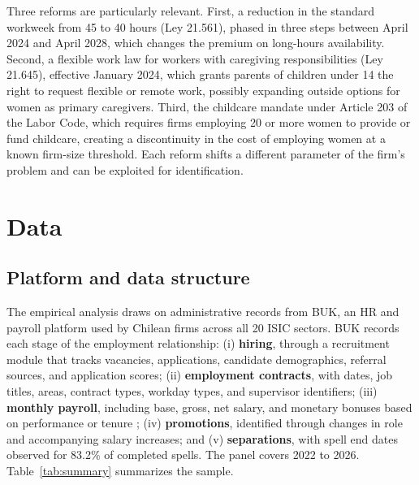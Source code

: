 \documentclass[11pt]{article}
\begin{document}
Three reforms are particularly relevant. First, a reduction in the standard workweek from 45 to 40 hours (Ley 21.561), phased in three steps between April 2024 and April 2028, which changes the premium on long-hours availability. Second, a flexible work law for workers with caregiving responsibilities (Ley 21.645), effective January 2024, which grants parents of children under 14 the right to request flexible or remote work, possibly expanding outside options for women as primary caregivers. Third, the childcare mandate under Article 203 of the Labor Code, which requires firms employing 20 or more women to provide or fund childcare, creating a discontinuity in the cost of employing women at a known firm-size threshold. Each reform shifts a different parameter of the firm's problem and can be exploited for identification.

\section{Data}

\subsection{Platform and data structure}

The empirical analysis draws on administrative records from BUK, an HR and payroll platform used by Chilean firms across all 20 ISIC sectors. BUK records each stage of the employment relationship: (i) \textbf{hiring}, through a recruitment module that tracks vacancies, applications, candidate demographics, referral sources, and application scores; (ii) \textbf{employment contracts}, with dates, job titles, areas, contract types, workday types, and supervisor identifiers; (iii) \textbf{monthly payroll}, including base, gross, net salary, and monetary bonuses based on performance or tenure ; (iv) \textbf{promotions}, identified through changes in role and accompanying salary increases; and (v) \textbf{separations}, with spell end dates observed for 83.2\% of completed spells. The panel covers 2022 to 2026. Table~\ref{tab:summary} summarizes the sample.
\end{document}

